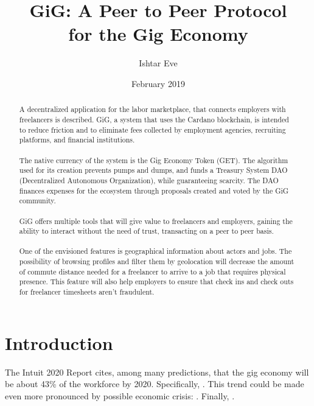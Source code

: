 \documentclass{article}
\title{GiG: A Peer to Peer Protocol \\for the Gig Economy}
\author{Ishtar Eve}
\date{February 2019}
\begin{document}
\maketitle

\begin{abstract}
A decentralized application for the labor marketplace, that connects employers with freelancers is described. GiG, a system that uses the Cardano blockchain, is intended to reduce friction and to eliminate fees collected by employment agencies, recruiting platforms, and financial institutions. 

\paragraph{} The native currency of the system is the Gig Economy Token (GET). The algorithm used for its creation prevents pumps and dumps, and funds a Treasury System DAO (Decentralized Autonomous Organization), while guaranteeing scarcity. The DAO finances expenses for the ecosystem through proposals created and voted by the GiG community.

\paragraph{} GiG offers multiple tools that will give value to freelancers and employers, gaining the ability to interact without the need of trust, transacting on a peer to peer basis.

\paragraph{} One of the envisioned features is geographical information about actors and jobs. The possibility of browsing profiles and filter them by geolocation will decrease the amount of commute distance needed for a freelancer to arrive to a job that requires physical presence. This feature will also help employers to ensure that check ins and check outs for freelancer timesheets aren't fraudulent.

\end{abstract}

\newpage
\tableofcontents
\newpage

\section{Introduction}

The Intuit 2020 Report\cite{intuit-2020-report} cites, among many predictions, that the gig economy will be about 43\% of the workforce by 2020. Specifically, . This trend could be made even more pronounced by possible economic crisis: . Finally, .
\end{document}
